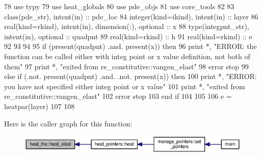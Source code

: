 \begin{DoxyCode}
78       \textcolor{keywordtype}{use }typy
79       \textcolor{keywordtype}{use }heat_globals
80       \textcolor{keywordtype}{use }pde_objs
81       \textcolor{keywordtype}{use }core_tools
82 
83       \textcolor{keywordtype}{class}(pde_str), \textcolor{keywordtype}{intent(in)} :: pde\_loc 
84       \textcolor{keywordtype}{integer(kind=ikind)}, \textcolor{keywordtype}{intent(in)} :: layer
86       \textcolor{keywordtype}{real(kind=rkind)}, \textcolor{keywordtype}{intent(in)}, \textcolor{keywordtype}{dimension(:)},  \textcolor{keywordtype}{optional} :: x
88       \textcolor{keywordtype}{type}(integpnt_str), \textcolor{keywordtype}{intent(in)}, \textcolor{keywordtype}{optional} :: quadpnt
89       \textcolor{keywordtype}{real(kind=rkind)} :: h
91       \textcolor{keywordtype}{real(kind=rkind)} :: e
92 
93        
94       
95       \textcolor{keywordflow}{if} (\textcolor{keyword}{present}(quadpnt) .and. \textcolor{keyword}{present}(x)) \textcolor{keywordflow}{then}
96         print *, \textcolor{stringliteral}{"ERROR: the function can be called either with integ point or x value definition, not both
       of them"}
97         print *, \textcolor{stringliteral}{"exited from re\_constitutive::vangen\_elast"}
98         error stop
99       \textcolor{keywordflow}{else} \textcolor{keywordflow}{if} (.not. \textcolor{keyword}{present}(quadpnt) .and. .not. \textcolor{keyword}{present}(x)) \textcolor{keywordflow}{then}
100         print *, \textcolor{stringliteral}{"ERROR: you have not specified either integ point or x value"}
101         print *, \textcolor{stringliteral}{"exited from re\_constitutive::vangen\_elast"}
102         error stop
103 \textcolor{keywordflow}{      end if}
104 
105 
106       e = heatpar(layer)%
107       
108 
\end{DoxyCode}


Here is the caller graph for this function\+:\nopagebreak
\begin{figure}[H]
\begin{center}
\leavevmode
\includegraphics[width=350pt]{namespaceheat__fnc_ac8c55750f6db4f746c249dfdc9391936_icgraph}
\end{center}
\end{figure}


